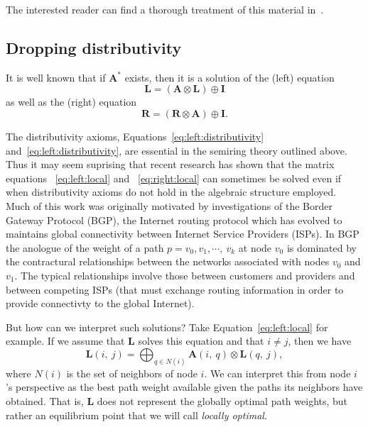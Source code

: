 The interested reader can find a thorough treatment of
this material in~\cite{gondran_graphs_2008}.

\subsection{Dropping distributivity}
\label{subsect.dropping.distributivity}

It is well known that if $\mathbf{A}^*$ exists, then it
is a solution of the (left) equation
\begin{equation}
\label{eq:left:local}
\mathbf{L} = (\mathbf{A}\otimes \mathbf{L}) \oplus \mathbf{I}
\end{equation}
as well as the (right) equation
\begin{equation}
\label{eq:right:local}
\mathbf{R} = (\mathbf{R}\otimes \mathbf{A}) \oplus \mathbf{I}.
\end{equation}

The distributivity axioms,
Equations~\ref{eq:left:distributivity} and~\ref{eq:left:distributivity},
are essential in the semiring theory outlined above.
Thus it may seem suprising that recent research has shown that
the matrix equations ~\ref{eq:left:local} and ~\ref{eq:right:local}
can sometimes be solved even if when
distributivity axioms do not hold in the algebraic structure employed.
Much of this work was originally motivated
by investigations of the Border Gateway Protocol (BGP),
the Internet routing protocol which has evolved to
maintains global connectivity between Internet Service Providers (ISPs).
In BGP the anologue of the weight of a path
$p = v_0, v_1, \cdots,\ v_k$ at node $v_0$
is dominated by the contractural relationships between
the networks associated with nodes $v_0$ and $v_1$.
The typical relationships involve those between customers
and providers and between competing ISPs (that must exchange
routing information in order to provide connectivty to
the global Internet).

But how can we interpret such solutions?
Take Equation~\ref{eq:left:local} for example.
If we assume that $\mathbf{L}$ solves this equation
and that $i \neq j$, then we have
\begin{equation}
\label{eq:left:local:at:i}
\mathbf{L}(i,\ j) = \displaystyle\bigoplus_{q \in N(i)} \mathbf{A}(i,\ q) \otimes \mathbf{L}(q,\ j),
\end{equation}
where $N(i)$ is the set of neighbors of node $i$.
We can interpret this from node $i$'s perspective as
the best path weight available given the paths its neighbors
have obtained.
That is, $\mathbf{L}$ does not represent the globally optimal
path weights, but rather an equilibrium point that we will
call \emph{locally optimal}.


